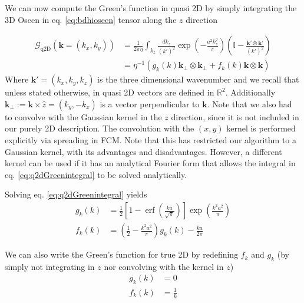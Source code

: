 \documentclass[ twoside,openright,titlepage,numbers=noenddot,%
headinclude,footinclude,cleardoublepage=empty,abstract=on,
BCOR=5mm,paper=a4,fontsize=11pt, dvipsnames
]{scrreprt}
\renewcommand{\vec}[1]{\bm{#1}}
\newcommand{\tens}[1]{\bm{\mathcal{#1}}}
\newcommand{\fou}[1]{\widehat{#1}}
\DeclareMathOperator{\erf}{erf}
\begin{document}
We can now compute the Green's function in quasi 2D by simply integrating the 3D Oseen in eq. \eqref{eq:bdhioseen} tensor along the $z$ direction

\begin{equation}
  \label{eq:q2dGreenintegral}
  \begin{aligned}
  \fou{\tens{G}}_{\text{q2D}}(\vec{k} = (k_x, k_y)) &= \frac{1}{2\pi\eta}\int_{k_z} \frac{dk_z}{(k')^2}\exp\left(-\frac{a^2k_z^2}{\pi}\right)\left( \mathbb{I} - \frac{\vec{k}'\otimes\vec{k}'}{(k')^2}\right) \\
  &= \eta^{-1}\left(g_k(k)\vec{k}_{\perp}\otimes\vec{k}_{\perp} + f_k(k)\vec{k}\otimes\vec{k}\right)
\end{aligned}
\end{equation}
Where $\vec{k}' = (k_x, k_y, k_z)$ is the three dimensional wavenumber and we recall that unless stated otherwise, in quasi 2D vectors are defined in $\mathbb{R}^2$. Additionally $\vec{k}_\perp := \vec{k}\times\hat{z} = (k_y, -k_x)$ is a vector perpendicular to $\vec{k}$. Note that we also had to convolve with the Gaussian kernel in the $z$ direction, since it is not included in our purely 2D description. The convolution with the $(x,y)$ kernel is performed explicitly via spreading in \gls{FCM}.
Note that this has restricted our algorithm to a Gaussian kernel, with its advantages and disadvantages. However, a different kernel can be used if it has an analytical Fourier form that allows the integral in eq. \eqref{eq:q2dGreenintegral} to be solved analytically.

Solving eq. \eqref{eq:q2dGreenintegral} yields
\begin{equation}
  \label{eq:q2dfg}
  \begin{aligned}
    g_{k}\left(k\right) & = \frac{1}{2}\left[1-{\erf}\left(\frac{ka}{\sqrt{\pi}}\right)\right]\exp\left(\frac{k^2a^2}{\pi}\right)\\
    f_{k}\left(k\right) & = \left(\frac{1}{2} - \frac{k^{2}a^2}{\pi}\right)g_k(k) - \frac{ka}{2\pi}
  \end{aligned}  
\end{equation}

We can also write the Green's function for true 2D by redefining $f_k$ and $g_k$ (by simply not integrating in $z$ nor convolving with the kernel in $z$)
\begin{equation}
  \label{eq:t2dfg}
  \begin{aligned}
    g_{k}\left(k\right) & = 0\\
    f_{k}\left(k\right) & = \frac{1}{k}
  \end{aligned}  
\end{equation}
\end{document}
